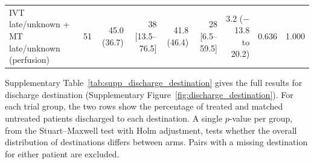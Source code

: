 \begin{landscape}
\begin{longtable}{p{5.6cm}rrrrrrrr}
IVT late/unknown + MT late/unknown (perfusion) & 51 & 45.0 (36.7) & 38 [13.5--76.5] & 41.8 (46.4) & 28 [6.5--59.5] & 3.2 ($-$13.8 to 20.2) & 0.636 & 1.000 \\
\end{longtable}
\vspace{-0.5\baselineskip}
\clearpage

{\normalsize
Supplementary Table~\ref{tab:supp_discharge_destination} gives the full results for discharge destination (Supplementary Figure~\ref{fig:discharge_destination}). For each trial group, the two rows show the percentage of treated and matched untreated patients discharged to each destination. A single $p$-value per group, from the Stuart--Maxwell test with Holm adjustment, tests whether the overall distribution of destinations differs between arms. Pairs with a missing destination for either patient are excluded.
\par}
\bigskip


\end{landscape}
